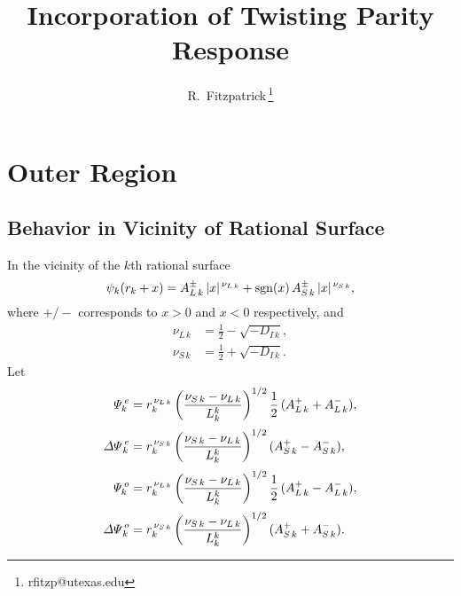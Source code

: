 \documentclass[12pt,prb,aps,notitlepage]{revtex4-1}
\begin{document}
\title{Incorporation of Twisting Parity Response}
\author{R.~Fitzpatrick\,\footnote{rfitzp@utexas.edu}}
\begin{abstract}
\end{abstract}
\maketitle

\section{Outer Region}
\subsection{Behavior in Vicinity of Rational Surface}
In the vicinity of the $k$th rational surface
\begin{equation}
\psi_k(r_k+x)= A_{L\,k}^\pm\,|x|^{\,\nu_{L\,k}} + {\rm sgn}(x)\,A_{S\,k}^{\pm}\,|x|^{\,\nu_{S\,k}},
\end{equation}
where $+/-$ corresponds to $x>0$ and $x<0$ respectively, and 
\begin{align}
\nu_{L\,k} &= \frac{1}{2}-\sqrt{-D_{I\,k}},\\[0.5ex]
\nu_{S\,k}&= \frac{1}{2}+\sqrt{-D_{I\,k}}.
\end{align}
Let
\begin{align}
{\mit\Psi}_k^{\,e} &= r_k^{\,\nu_{L\,k}}\left(\frac{\nu_{S\,k} - \nu_{L\,k}}{L_k^k}\right)^{1/2}\frac{1}{2}\,(A_{L\,k}^+  + A_{L\,k}^-),\\[0.5ex]
{\mit\Delta\Psi}_k^{\,e} &= r_k^{\,\nu_{S\,k}}\left(\frac{\nu_{S\,k} - \nu_{L\,k}}{L_k^k}\right)^{1/2}(A_{S\,k}^+  - A_{S\,k}^-),\\[0.5ex]
{\mit\Psi}_k^{\,o} &= r_k^{\,\nu_{L\,k}}\left(\frac{\nu_{S\,k} - \nu_{L\,k}}{L_k^k}\right)^{1/2}\frac{1}{2}\,(A_{L\,k}^+  - A_{L\,k}^-),\\[0.5ex]
{\mit\Delta\Psi}_k^{\,o} &= r_k^{\,\nu_{S\,k}}\left(\frac{\nu_{S\,k} - \nu_{L\,k}}{L_k^k}\right)^{1/2}(A_{S\,k}^+  + A_{S\,k}^-).
\end{align}
\end{document}

